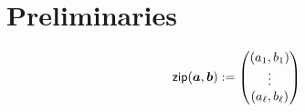 \section{Preliminaries}\label{sec:prelim}

\[\mathsf{zip}(\boldsymbol{a},\boldsymbol{b}) := \begin{pmatrix}(a_1,b_1)\\
\vdots\\
(a_\ell,b_\ell) \end{pmatrix}\]
